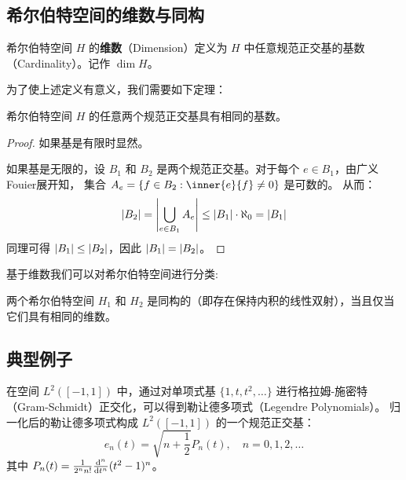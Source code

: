 \subsection{希尔伯特空间的维数与同构}

\begin{definition}[Dimension]
    希尔伯特空间 \(H\) 的\textbf{维数}（Dimension）定义为 \(H\)
    中任意规范正交基的基数（Cardinality）。记作 \(\dim H\)。
\end{definition}

为了使上述定义有意义，我们需要如下定理：

\begin{theorem}
    希尔伯特空间 \(H\) 的任意两个规范正交基具有相同的基数。
\end{theorem}

\begin{proof}
    如果基是有限时显然。

    如果基是无限的，设 \(B_1\) 和 \(B_2\) 是两个规范正交基。对于每个 \(e \in B_1\)，由广义Fouier展开知，
    集合 \(A_e = \{f \in B_2 : \inner{e}{f} \neq 0\}\) 是可数的。
    从而：\[
        \left|B_2\right| = \left|\bigcup_{e \in B_1} A_e\right| \leq \left|B_1\right|
        \cdot \aleph_0 = \left|B_1\right|
    \]
    同理可得 \(\left|B_1\right| \leq \left|B_2\right|\)，因此 \(\left|B_1\right| = \left|B_2\right|\)。
\end{proof}

基于维数我们可以对希尔伯特空间进行分类:

\begin{theorem}[Isomorphism]
    两个希尔伯特空间 \(H_1\) 和 \(H_2\) 是同构的（即存在保持内积的线性双射），当且仅当它们具有相同的维数。
\end{theorem}

\begin{example}

\end{example}

\subsection{典型例子}

\begin{example}
    在空间 \(L^2([-1, 1])\) 中，通过对单项式基 \(\{1, t, t^2, \dots\}\)
    进行格拉姆-施密特（Gram-Schmidt）正交化，可以得到勒让德多项式（Legendre Polynomials）。
    归一化后的勒让德多项式构成 \(L^2([-1, 1])\) 的一个规范正交基：
    \[
        e_n(t) = \sqrt{n + \frac{1}{2}} P_n(t), \quad n = 0, 1, 2, \dots
    \]
    其中 \(P_n(t) = \frac{1}{2^n n!} \odv[n]{}{t}(t^2 - 1)^n\)。
\end{example}

